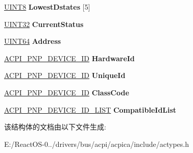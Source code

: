 \begin{DoxyCompactItemize}
\item 
\mbox{\label{structacpi__device__info_a57f3ad8711a360dedb1a783bb2ed3f8f}} 
\hyperlink{_processor_bind_8h_ab27e9918b538ce9d8ca692479b375b6a}{U\+I\+N\+T8} {\bfseries Lowest\+Dstates} \mbox{[}5\mbox{]}
\item 
\mbox{\label{structacpi__device__info_a8e6f887267586c3561a111a52a314465}} 
\hyperlink{_processor_bind_8h_ae1e6edbbc26d6fbc71a90190d0266018}{U\+I\+N\+T32} {\bfseries Current\+Status}
\item 
\mbox{\label{structacpi__device__info_a828d93ab77f2b1af06977b859a571dc3}} 
\hyperlink{_processor_bind_8h_a57be03562867144161c1bfee95ca8f7c}{U\+I\+N\+T64} {\bfseries Address}
\item 
\mbox{\label{structacpi__device__info_a51cd6c51e1fbe7e8c8873f121a6fbad6}} 
\hyperlink{structacpi__pnp__device__id}{A\+C\+P\+I\+\_\+\+P\+N\+P\+\_\+\+D\+E\+V\+I\+C\+E\+\_\+\+ID} {\bfseries Hardware\+Id}
\item 
\mbox{\label{structacpi__device__info_a648bcdd3d74619d80c57673b4b869570}} 
\hyperlink{structacpi__pnp__device__id}{A\+C\+P\+I\+\_\+\+P\+N\+P\+\_\+\+D\+E\+V\+I\+C\+E\+\_\+\+ID} {\bfseries Unique\+Id}
\item 
\mbox{\label{structacpi__device__info_a8d2c25c84a88862068cbcdf110eeeaaa}} 
\hyperlink{structacpi__pnp__device__id}{A\+C\+P\+I\+\_\+\+P\+N\+P\+\_\+\+D\+E\+V\+I\+C\+E\+\_\+\+ID} {\bfseries Class\+Code}
\item 
\mbox{\label{structacpi__device__info_a77429b7a5b7a5a273be5c92d6cf0928a}} 
\hyperlink{structacpi__pnp__device__id__list}{A\+C\+P\+I\+\_\+\+P\+N\+P\+\_\+\+D\+E\+V\+I\+C\+E\+\_\+\+I\+D\+\_\+\+L\+I\+ST} {\bfseries Compatible\+Id\+List}
\end{DoxyCompactItemize}


该结构体的文档由以下文件生成\+:\begin{DoxyCompactItemize}
\item 
E\+:/\+React\+O\+S-\/0../drivers/bus/acpi/acpica/include/actypes.\+h\end{DoxyCompactItemize}
